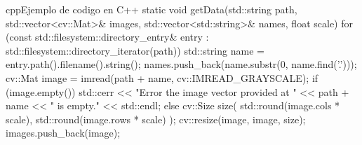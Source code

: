 \begin{code}{cpp}{Ejemplo de codigo en C++}
static void getData(std::string path, std::vector<cv::Mat>& images, std::vector<std::string>& names, float scale){
  for (const std::filesystem::directory_entry& entry : std::filesystem::directory_iterator(path)) {
    std::string name = entry.path().filename().string();
    names.push_back(name.substr(0, name.find('.')));
    cv::Mat image = imread(path + name, cv::IMREAD_GRAYSCALE);
    if (image.empty()) {
      std::cerr << "Error the image vector provided at " << path + name << " is empty." << std::endl;
    } else {
      cv::Size size( std::round(image.cols * scale), std::round(image.rows * scale) );
      cv::resize(image, image, size);
      images.push_back(image);
    }
  }
}
\end{code}

